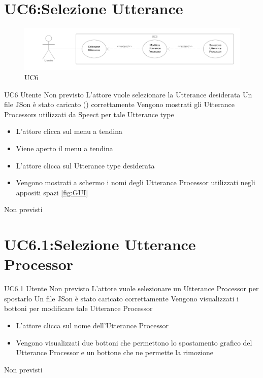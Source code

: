 \documentclass[../AnalisideiRequisiti.tex]{subfiles}
\begin{document}
\section{UC6:Selezione Utterance}
\begin{figure}[H]
	\caption{UC6}
	\centering
	\includegraphics[width=\textwidth]{../img/UC06.png}
\end{figure}
\UserCase
{UC6}
{Utente}
{Non previsto}
{L'attore vuole selezionare la Utterance desiderata}
{Un file JSon è stato caricato () correttamente }
{Vengono mostrati gli Utterance Processors utilizzati da Speect per tale Utterance type}
{
	\begin{itemize}
		\item{} L'attore clicca sul menu a tendina
		\item{} Viene aperto il menu a tendina
		\item{} L'attore clicca sul Utterance type desiderata
		\item{} Vengono mostrati a schermo i nomi degli Utterance Processor utilizzati negli appositi spazi \ref{fig:GUI}		
	\end{itemize}
}
{Non previsti}

\section{UC6.1:Selezione Utterance Processor}
\UserCase
{UC6.1}
{Utente}
{Non previsto}
{L'attore vuole selezionare un Utterance Processor per spostarlo}
{Un file JSon è stato caricato correttamente }
{Vengono visualizzati i bottoni per modificare tale Utterance Processor}
{
	\begin{itemize}
		\item{} L'attore clicca sul nome dell'Utterance Processor
		\item{} Vengono visualizzati due bottoni che permettono lo spostamento grafico del Utterance Processor  e un bottone che ne permette la rimozione  		
	\end{itemize}
}
{Non previsti}
\end{document}
